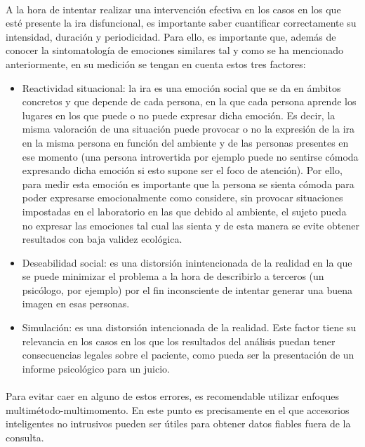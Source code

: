 \paragraph{}
A la hora de intentar realizar una intervención efectiva en los casos en los que esté presente la ira disfuncional, es importante saber cuantificar correctamente su intensidad, duración y periodicidad. Para ello, es importante que, además de conocer la sintomatología de emociones similares tal y como se ha mencionado anteriormente, en su medición se tengan en cuenta estos tres factores:
\begin{itemize}
    \item Reactividad situacional: la ira es una emoción social que se da en ámbitos concretos y que depende de cada persona, en la que cada persona aprende los lugares en los que puede o no puede expresar dicha emoción. Es decir, la misma valoración de una situación puede provocar o no la expresión de la ira en la misma persona en función del ambiente y de las personas presentes en ese momento (una persona introvertida por ejemplo puede no sentirse cómoda expresando dicha emoción si esto supone ser el foco de atención). Por ello, para medir esta emoción es importante que la persona se sienta cómoda para poder expresarse emocionalmente como considere, sin provocar situaciones impostadas en el laboratorio en las que debido al ambiente, el sujeto pueda no expresar las emociones tal cual las sienta y de esta manera se evite obtener resultados con baja validez ecológica.
    
    \item Deseabilidad social: es una distorsión inintencionada de la realidad en la que se puede minimizar el problema a la hora de describirlo a terceros (un psicólogo, por ejemplo) por el fin inconsciente de intentar generar una buena imagen en esas personas.
    
    \item Simulación: es una distorsión intencionada de la realidad. Este factor tiene su relevancia en los casos en los que los resultados del análisis puedan tener consecuencias legales sobre el paciente, como pueda ser la presentación de un informe psicológico para un juicio.
\end{itemize}

\paragraph{}
Para evitar caer en alguno de estos errores, es recomendable utilizar enfoques multimétodo-multimomento. En este punto es precisamente en el que accesorios inteligentes no intrusivos pueden ser útiles para obtener datos fiables fuera de la consulta.


